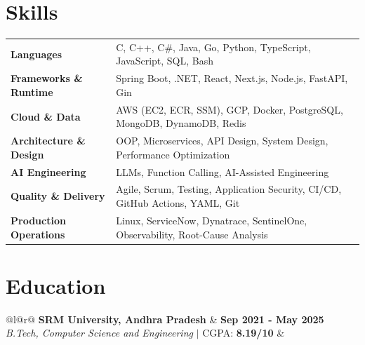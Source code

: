 \documentclass[10pt,a4paper]{article}
\begin{document}
\section{\Large{\textbf{Skills}}}
\begin{tabularx}{\linewidth}{@{}l X@{}}
\textbf{Languages} & C, C++, C\#, Java, Go, Python, TypeScript, JavaScript, SQL, Bash \\[1pt]
\textbf{Frameworks \& Runtime} & Spring Boot, .NET, React, Next.js, Node.js, FastAPI, Gin \\[1pt]
\textbf{Cloud \& Data} & AWS (EC2, ECR, SSM), GCP, Docker, PostgreSQL, MongoDB, DynamoDB, Redis \\[1pt]
\textbf{Architecture \& Design} & OOP, Microservices, API Design, System Design, Performance Optimization \\[1pt]
\textbf{AI Engineering} & LLMs, Function Calling, AI-Assisted Engineering \\[1pt]
\textbf{Quality \& Delivery} & Agile, Scrum, Testing, Application Security, CI/CD, GitHub Actions, YAML, Git \\[1pt]
\textbf{Production Operations} & Linux, ServiceNow, Dynatrace, SentinelOne, Observability, Root-Cause Analysis
\end{tabularx}


\section{\Large{\textbf{Education}}}
\begin{tabularx}{\linewidth}{@{}l@{\extracolsep{\fill}}r@{}}
\textbf{SRM University, Andhra Pradesh} & \textbf{Sep 2021 - May 2025} \\
\textit{B.Tech, Computer Science and Engineering} $|$ CGPA: \textbf{8.19/10} & \\
\end{tabularx}

\vfill
\end{document}
